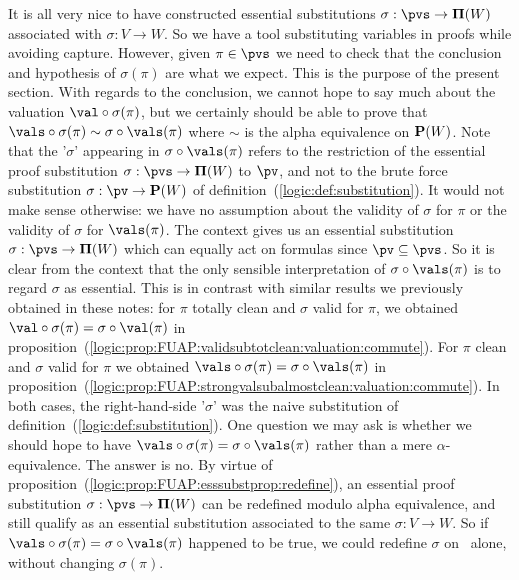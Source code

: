 It is all very nice to have constructed essential substitutions
$\sigma:\pvs\to{\bf\Pi}(W)$ associated with $\sigma:V\to W$. So we
have a tool substituting variables in proofs while avoiding capture.
However, given $\pi\in\pvs$ we need to check that the conclusion and
hypothesis of $\sigma(\pi)$ are what we expect. This is the purpose
of the present section. With regards to the conclusion, we cannot
hope to say much about the valuation $\val\circ\sigma(\pi)$, but we
certainly should be able to prove that
$\vals\circ\sigma(\pi)\sim\sigma\circ\vals(\pi)$ where $\sim$ is the
alpha equivalence on ${\bf P}(W)$. Note that the '$\sigma$'
appearing in $\sigma\circ\vals(\pi)$ refers to the restriction of
the essential proof substitution $\sigma:\pvs\to{\bf\Pi}(W)$  to
$\pv$, and not to the brute force substitution $\sigma:\pv\to{\bf
P}(W)$ of definition~(\ref{logic:def:substitution}). It would not
make sense otherwise: we have no assumption about the validity of
$\sigma$ for $\pi$ or the validity of $\sigma$ for $\vals(\pi)$. The
context gives us an essential substitution
$\sigma:\pvs\to{\bf\Pi}(W)$ which can equally act on formulas since
$\pv\subseteq\pvs$. So it is clear from the context that the only
sensible interpretation of $\sigma\circ\vals(\pi)$ is to regard
$\sigma$ as essential. This is in contrast with similar results we
previously obtained in these notes: for $\pi$ totally clean and
$\sigma$ valid for $\pi$, we obtained
$\val\circ\sigma(\pi)=\sigma\circ\val(\pi)$ in
proposition~(\ref{logic:prop:FUAP:validsubtotclean:valuation:commute}).
For $\pi$ clean and $\sigma$ valid for $\pi$ we obtained
$\vals\circ\sigma(\pi)=\sigma\circ\vals(\pi)$ in
proposition~(\ref{logic:prop:FUAP:strongvalsubalmostclean:valuation:commute}).
In both cases, the right-hand-side '$\sigma$' was the naive
substitution of definition~(\ref{logic:def:substitution}). One
question we may ask is whether we should hope to have
$\vals\circ\sigma(\pi)=\sigma\circ\vals(\pi)$ rather than a mere
$\alpha$-equivalence. The answer is no. By virtue of
proposition~(\ref{logic:prop:FUAP:esssubstprop:redefine}), an
essential proof substitution $\sigma:\pvs\to{\bf \Pi}(W)$ can be
redefined modulo alpha equivalence, and still qualify as
an essential substitution associated to the same $\sigma:V\to W$. So
if $\vals\circ\sigma(\pi)=\sigma\circ\vals(\pi)$ happened to be
true, we could redefine $\sigma$ on \pv\ alone, without changing
$\sigma(\pi)$.


